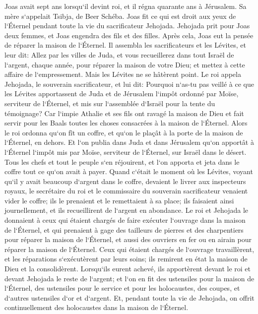 \verse Joas avait sept ans lorsqu`il devint roi, et il régna quarante ans à Jérusalem. Sa mère s`appelait Tsibja, de Beer Schéba. 
\verse Joas fit ce qui est droit aux yeux de l`Éternel pendant toute la vie du sacrificateur Jehojada. 
\verse Jehojada prit pour Joas deux femmes, et Joas engendra des fils et des filles. 
\verse Après cela, Joas eut la pensée de réparer la maison de l`Éternel. 
\verse Il assembla les sacrificateurs et les Lévites, et leur dit: Allez par les villes de Juda, et vous recueillerez dans tout Israël de l`argent, chaque année, pour réparer la maison de votre Dieu; et mettez à cette affaire de l`empressement. Mais les Lévites ne se hâtèrent point. 
\verse Le roi appela Jehojada, le souverain sacrificateur, et lui dit: Pourquoi n`as-tu pas veillé à ce que les Lévites apportassent de Juda et de Jérusalem l`impôt ordonné par Moïse, serviteur de l`Éternel, et mis sur l`assemblée d`Israël pour la tente du témoignage? 
\verse Car l`impie Athalie et ses fils ont ravagé la maison de Dieu et fait servir pour les Baals toutes les choses consacrées à la maison de l`Éternel. 
\verse Alors le roi ordonna qu`on fît un coffre, et qu`on le plaçât à la porte de la maison de l`Éternel, en dehors. 
\verse Et l`on publia dans Juda et dans Jérusalem qu`on apportât à l`Éternel l`impôt mis par Moïse, serviteur de l`Éternel, sur Israël dans le désert. 
\verse Tous les chefs et tout le peuple s`en réjouirent, et l`on apporta et jeta dans le coffre tout ce qu`on avait à payer. 
\verse Quand c`était le moment où les Lévites, voyant qu`il y avait beaucoup d`argent dans le coffre, devaient le livrer aux inspecteurs royaux, le secrétaire du roi et le commissaire du souverain sacrificateur venaient vider le coffre; ils le prenaient et le remettaient à sa place; ils faisaient ainsi journellement, et ils recueillirent de l`argent en abondance. 
\verse Le roi et Jehojada le donnaient à ceux qui étaient chargés de faire exécuter l`ouvrage dans la maison de l`Éternel, et qui prenaient à gage des tailleurs de pierres et des charpentiers pour réparer la maison de l`Éternel, et aussi des ouvriers en fer ou en airain pour réparer la maison de l`Éternel. 
\verse Ceux qui étaient chargés de l`ouvrage travaillèrent, et les réparations s`exécutèrent par leurs soins; ils remirent en état la maison de Dieu et la consolidèrent. 
\verse Lorsqu`ils eurent achevé, ils apportèrent devant le roi et devant Jehojada le reste de l`argent; et l`on en fit des ustensiles pour la maison de l`Éternel, des ustensiles pour le service et pour les holocaustes, des coupes, et d`autres ustensiles d`or et d`argent. Et, pendant toute la vie de Jehojada, on offrit continuellement des holocaustes dans la maison de l`Éternel. 
